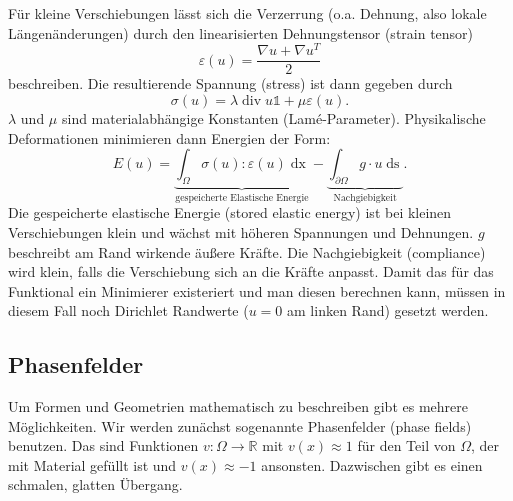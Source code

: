 \documentclass[a4paper, 12pt]{scrartcl}
\newcommand{\R}{\mathbb{R}}
\DeclareMathOperator{\divergence}{div}
\begin{document}

Für kleine Verschiebungen lässt sich die Verzerrung (o.a. Dehnung, also lokale Längenänderungen) durch den linearisierten Dehnungstensor (strain tensor)
\[ \varepsilon (u) = \frac{ \nabla u + \nabla u^T }{2}\]
beschreiben. Die resultierende Spannung (stress) ist dann gegeben durch
\[ \sigma (u) = \lambda \divergence u \mathds{1}+ \mu \varepsilon(u).\]
$\lambda$ und $\mu$ sind materialabhängige Konstanten (Lamé-Parameter). Physikalische Deformationen minimieren dann Energien der Form:
\[ E(u) = \underbrace{\int_\Omega \sigma(u) : \varepsilon(u) \mathop{dx}}_{\text{gespeicherte Elastische Energie}} - \underbrace{ \int_{\partial \Omega} g \cdot u \mathop{ds}}_{\text{Nachgiebigkeit}}. \]
Die gespeicherte elastische Energie (stored elastic energy) ist bei kleinen Verschiebungen klein und wächst mit höheren Spannungen und Dehnungen. $g$ beschreibt am Rand wirkende äußere Kräfte. Die Nachgiebigkeit (compliance) wird klein, falls die Verschiebung sich an die Kräfte anpasst. Damit das für das Funktional ein Minimierer existeriert und man diesen berechnen kann, müssen in diesem Fall noch Dirichlet Randwerte ($u=0$ am linken Rand) gesetzt werden.

\subsection{Phasenfelder}
Um Formen und Geometrien mathematisch zu beschreiben gibt es mehrere Möglichkeiten. Wir werden zunächst sogenannte Phasenfelder (phase fields) benutzen. Das sind Funktionen $v: \Omega \to \R$ mit $v(x)\approx 1$ für den Teil von $\Omega$, der mit Material gefüllt ist und $v(x) \approx -1$ ansonsten. Dazwischen gibt es einen schmalen, glatten Übergang. \\
\end{document}
